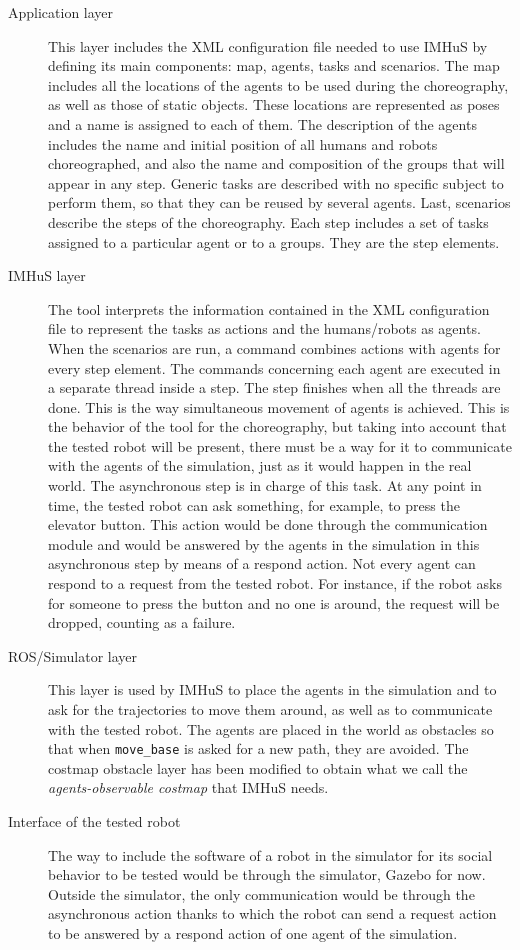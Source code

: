 \begin{description}
    \item[Application layer] This layer includes the XML configuration file needed to use IMHuS by defining its main components: map, agents, tasks and scenarios. The map includes all the locations of the agents to be used during the choreography, as well as those of static objects. These locations are represented as poses and a name is assigned to each of them. The description of the agents includes the name and initial position of all humans and robots choreographed, and also the name and composition of the groups that will appear in any step. Generic tasks are described with no specific subject to perform them, so that they can be reused by several agents. Last, scenarios describe the steps of the choreography. Each step includes a set of tasks assigned to a particular agent or to a groups. They are the step elements. 
    \item[IMHuS layer] The tool interprets the information contained in the XML configuration file to represent the tasks as actions and the humans/robots as agents. When the scenarios are run, a command combines actions with agents for every step element. The commands concerning each agent are executed in a separate thread inside a step. The step finishes when all the threads are done. This is the way simultaneous movement of agents is achieved. 
    This is the behavior of the tool for the choreography, but taking into account that the tested robot will be present, there must be a way for it to communicate with the agents of the simulation, just as it would happen in the real world. The asynchronous step is in charge of this task. At any point in time, the tested robot can ask something, for example, to press the elevator button. This action would be done through the communication module and would be answered by the agents in the simulation in this asynchronous step by means of a respond action. Not every agent can respond to a request from the tested robot. For instance, if the robot asks for someone to press the button and no one is around, the request will be dropped, counting as a failure.
    \item[ROS/Simulator layer] This layer is used by IMHuS to place the agents in the simulation and to ask for the trajectories to move them around, as well as to communicate with the tested robot. The agents are placed in the world as obstacles so that when \texttt{move\_base} is asked for a new path, they are avoided. The costmap obstacle layer has been modified to obtain what we call the \textit{agents-observable costmap} that IMHuS needs.
    \item[Interface of the tested robot] The way to include the software of a robot in the simulator for its social behavior to be tested would be through the simulator, Gazebo for now. Outside the simulator, the only communication would be through the asynchronous action thanks to which the robot can send a request action to be answered by a respond action of one agent of the simulation.
\end{description}


